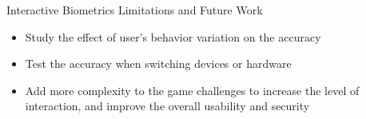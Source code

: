 \begin{frame}{Interactive Biometrics Limitations and Future Work}

\begin{itemize}
\item Study the effect of user's behavior variation on the accuracy

\item Test the accuracy when switching devices or hardware

\item  Add more complexity to the game challenges to increase the level of interaction, and improve the overall usability and security

\end{itemize}

\end{frame}